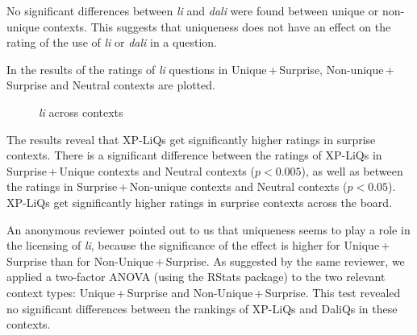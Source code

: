 \documentclass[output=paper,
colorlinks,
citecolor=brown,
newtxmath
]{langscibook}
\begin{document}
No significant differences between \textit{li} and \textit{dali} were found between unique or non-unique contexts. This suggests that uniqueness does not have an effect on the rating of the use of \textit{li} or \textit{dali} in a question.

In  the results of the ratings of \textit{li} questions in Unique\,+\,Surprise, Non-unique\,+\,Surprise and Neutral contexts are plotted.


\begin{figure}
    \caption{\textit{li} across contexts}
    \label{lipic}
\end{figure}

The results reveal that XP-LiQs get significantly higher ratings in surprise contexts. There is a significant difference between the ratings of XP-LiQs in Surprise\,+\,Unique contexts and Neutral contexts ($p<0.005$), as well as between the ratings in Surprise\,+\,Non-unique contexts and Neutral contexts ($p<0.05$). XP-LiQs get significantly higher ratings in surprise contexts across the board.

An anonymous reviewer pointed out to us that uniqueness seems to play a role in the licensing of \textit{li}, because the significance of the effect is higher for Unique\,+\,Surprise than for
Non-Unique\,+\,Surprise. As suggested by the same reviewer, we applied a two-factor ANOVA (using the RStats package) to the two relevant context types: Unique\,+\,Surprise and Non-Unique\,+\,Surprise. This test revealed no significant differences between the rankings of XP-LiQs and DaliQs in these contexts.
\end{document}
